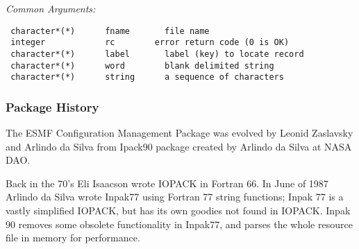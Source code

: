 {\em Common Arguments:}

 \begin{verbatim}
 character*(*)      fname       file name
 integer            rc        error return code (0 is OK)
 character*(*)      label       label (key) to locate record
 character*(*)      word        blank delimited string
 character*(*)      string      a sequence of characters
 \end{verbatim}


    \subsubsection{Package History}
       The ESMF Configuration Management Package was evolved by 
       Leonid Zaslavsky and Arlindo da Silva from Ipack90 package
       created by Arlindo da Silva at NASA DAO.

       Back in the 70's Eli Isaacson wrote IOPACK in Fortran
       66.  In June of 1987 Arlindo da Silva wrote Inpak77 using
       Fortran 77 string functions; Inpak 77 is a vastly
       simplified IOPACK, but has its own goodies not found in
       IOPACK.  Inpak 90 removes some obsolete functionality in
       Inpak77, and parses the whole resource file in memory for
       performance. 


